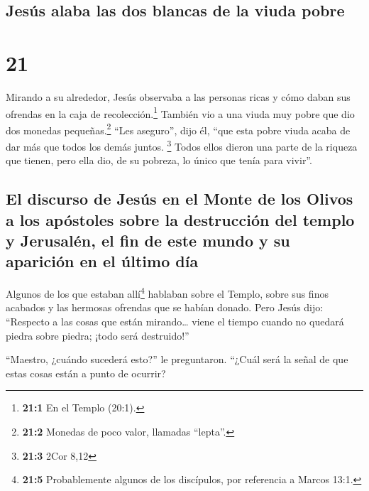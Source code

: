 \hypertarget{jesuxfas-alaba-las-dos-blancas-de-la-viuda-pobre}{%
\subsection{Jesús alaba las dos blancas de la viuda
pobre}\label{jesuxfas-alaba-las-dos-blancas-de-la-viuda-pobre}}

\hypertarget{section-20}{%
\section{21}\label{section-20}}

 Mirando a su alrededor, Jesús observaba a las personas
ricas y cómo daban sus ofrendas en la caja de recolección.\footnote{\textbf{21:1}
  En el Templo (20:1).}  También vio a una viuda muy pobre
que dio dos monedas pequeñas.\footnote{\textbf{21:2} Monedas de poco
  valor, llamadas ``lepta''.}  ``Les aseguro'', dijo él,
``que esta pobre viuda acaba de dar más que todos los demás juntos.
\footnote{\textbf{21:3} 2Cor 8,12}  Todos ellos dieron una
parte de la riqueza que tienen, pero ella dio, de su pobreza, lo único
que tenía para vivir''.

\hypertarget{el-discurso-de-jesuxfas-en-el-monte-de-los-olivos-a-los-apuxf3stoles-sobre-la-destrucciuxf3n-del-templo-y-jerusaluxe9n-el-fin-de-este-mundo-y-su-apariciuxf3n-en-el-uxfaltimo-duxeda}{%
\subsection{El discurso de Jesús en el Monte de los Olivos a los
apóstoles sobre la destrucción del templo y Jerusalén, el fin de este
mundo y su aparición en el último
día}\label{el-discurso-de-jesuxfas-en-el-monte-de-los-olivos-a-los-apuxf3stoles-sobre-la-destrucciuxf3n-del-templo-y-jerusaluxe9n-el-fin-de-este-mundo-y-su-apariciuxf3n-en-el-uxfaltimo-duxeda}}

 Algunos de los que estaban allí\footnote{\textbf{21:5}
  Probablemente algunos de los discípulos, por referencia a Marcos 13:1.}
hablaban sobre el Templo, sobre sus finos acabados y las hermosas
ofrendas que se habían donado. Pero Jesús dijo: 
``Respecto a las cosas que están mirando\ldots{} viene el tiempo cuando
no quedará piedra sobre piedra; ¡todo será destruido!''

 ``Maestro, ¿cuándo sucederá esto?'' le preguntaron.
``¿Cuál será la señal de que estas cosas están a punto de ocurrir?

